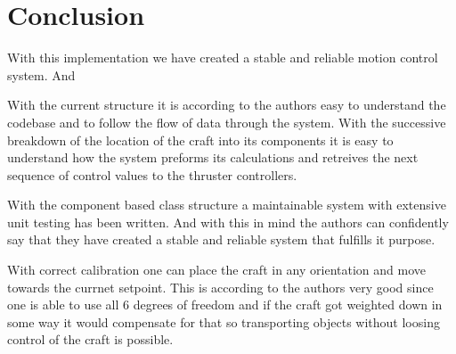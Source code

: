 \section{Conclusion}\label{sec:conclusion}

With this implementation we have created a stable and reliable motion control system. And 

With the current structure it is according to the authors easy to understand the codebase and to follow the flow of data through the system. With the successive breakdown of the location of the craft into its components it is easy to understand how the system preforms its calculations and retreives the next sequence of control values to the thruster controllers.

With the component based class structure a maintainable system with extensive unit testing has been written. And with this in mind the authors can confidently say that they have created a stable and reliable system that fulfills it purpose.

With correct calibration one can place the craft in any orientation and move towards the currnet setpoint. This is according to the authors very good since one is able to use all 6 degrees of freedom and if the craft got weighted down in some way it would compensate for that so transporting objects without loosing control of the craft is possible.
